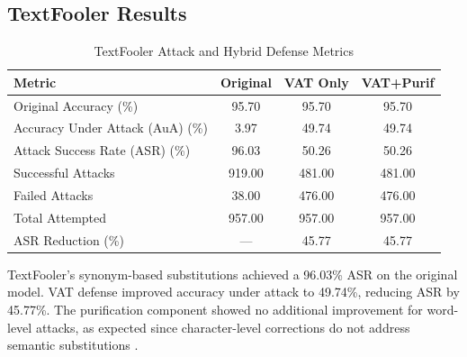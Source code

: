 \documentclass[../main.tex]{subfiles}
\begin{document}
\subsection{TextFooler Results}
\begin{table}[H]
\caption{TextFooler Attack and Hybrid Defense Metrics}
\label{tab:textfooler_results}
\centering
\footnotesize
\begin{tabular}{@{\hspace{0.3cm}}l*{3}{S[table-format=3.2]}@{\hspace{0.3cm}}}
\toprule
\textbf{Metric} & {\textbf{Original}} & {\textbf{VAT Only}} & {\textbf{VAT+Purif}} \\
\midrule
Original Accuracy (\%) & 95.70 & 95.70 & 95.70 \\
Accuracy Under Attack (AuA) (\%) & 3.97 & 49.74 & 49.74 \\
Attack Success Rate (ASR) (\%) & 96.03 & 50.26 & 50.26 \\
Successful Attacks & 919.00 & 481.00 & 481.00 \\
Failed Attacks & 38.00 & 476.00 & 476.00 \\
Total Attempted & 957.00 & 957.00 & 957.00 \\
ASR Reduction (\%) & {---} & 45.77 & 45.77 \\
\bottomrule
\end{tabular}
\end{table}



\FloatBarrier

TextFooler's synonym-based substitutions achieved a 96.03\% ASR on the original model. VAT defense improved accuracy under attack to 49.74\%, reducing ASR by 45.77\%. The purification component showed no additional improvement for word-level attacks, as expected since character-level corrections do not address semantic substitutions \cite{jin2019textfooler}.
\end{document}
